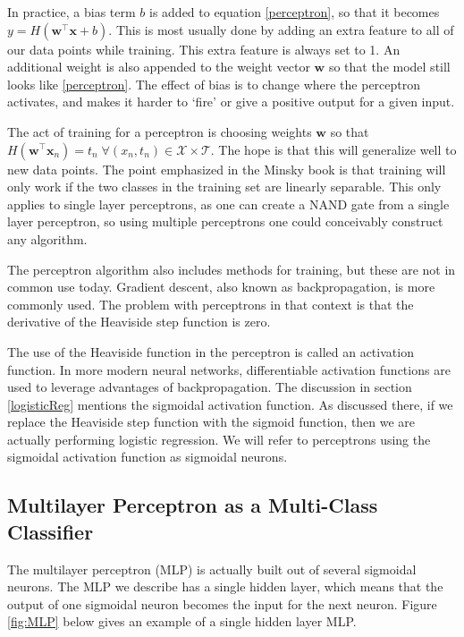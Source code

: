 In practice, a bias term \( b \) is added to equation \ref{perceptron}, so that it becomes \( y = H(\bm w^{\intercal} \bm x +b) \). This is most usually done by adding an extra feature to all of our data points while training. This extra feature is always set to 1.  An additional weight is also appended to the weight vector \( \bm w \) so that the model still looks like \ref{perceptron}. The effect of bias is to change where the perceptron activates, and makes it harder to `fire' or give a positive output for a given input.  

The act of training for a perceptron is choosing weights \( \bm w \) so that \( H(\bm w^{\intercal} \bm x_n) = t_n\;\forall (x_n,t_n)\in \mathcal{X}\times \mathcal{T} \). The hope is that this will generalize well to new data points.  The point emphasized in the Minsky book \cite{Minsky90Perceptron} is that training will only work if the two classes in the training set are linearly separable.  This only applies to single layer perceptrons, as one can create a NAND gate from a single layer perceptron, so using multiple perceptrons one could conceivably construct any algorithm.

The perceptron algorithm also includes methods for training, but these are not in common use today.  Gradient descent, also known as backpropagation, is more commonly used.  The problem with perceptrons in that context is that the derivative of the Heaviside step function is zero. 

The use of the Heaviside function in the perceptron is called an activation function.  In more modern neural networks, differentiable activation functions are used to leverage advantages of backpropagation.  The discussion in section \ref{logisticReg} mentions the sigmoidal activation function.  As discussed there, if we replace the Heaviside step function with the sigmoid function, then we are actually performing logistic regression.  We will refer to perceptrons using the sigmoidal activation function as sigmoidal neurons.

\subsection{Multilayer Perceptron as a Multi-Class Classifier}
The multilayer perceptron (MLP) is actually built out of several sigmoidal neurons.  The MLP we describe has a single hidden layer, which means that the output of one sigmoidal neuron becomes the input for the next neuron.  Figure \ref{fig:MLP} below gives an example of a single hidden layer MLP.


